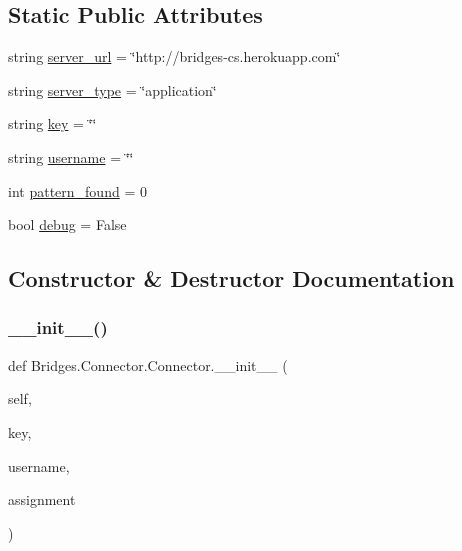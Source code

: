 \subsection*{Static Public Attributes}
\begin{DoxyCompactItemize}
\item 
string \mbox{\hyperlink{class_bridges_1_1_connector_1_1_connector_ace67271b56f8436d101e686f674acf19}{server\+\_\+url}} = \char`\"{}http\+://bridges-\/cs.\+herokuapp.\+com\char`\"{}
\item 
string \mbox{\hyperlink{class_bridges_1_1_connector_1_1_connector_ad7461a1eead38bd2ff2b6c2555f0cc61}{server\+\_\+type}} = \char`\"{}application\char`\"{}
\item 
string \mbox{\hyperlink{class_bridges_1_1_connector_1_1_connector_a3828c14583f6ba624383ead558f6a991}{key}} = \char`\"{}\char`\"{}
\item 
string \mbox{\hyperlink{class_bridges_1_1_connector_1_1_connector_acebfb8bb7592210bd98c4bb42142e35b}{username}} = \char`\"{}\char`\"{}
\item 
int \mbox{\hyperlink{class_bridges_1_1_connector_1_1_connector_ace7620706cfa2b5ca62026f10f243041}{pattern\+\_\+found}} = 0
\item 
bool \mbox{\hyperlink{class_bridges_1_1_connector_1_1_connector_a64d51697f1f2864b5dfddd08546da8f6}{debug}} = False
\end{DoxyCompactItemize}


\subsection{Constructor \& Destructor Documentation}
\mbox{\label{class_bridges_1_1_connector_1_1_connector_a805cd728024ded37faace7e858418cb0}} 
\subsubsection{\texorpdfstring{\+\_\+\+\_\+init\+\_\+\+\_\+()}{\_\_init\_\_()}}
{\footnotesize\ttfamily def Bridges.\+Connector.\+Connector.\+\_\+\+\_\+init\+\_\+\+\_\+ (\begin{DoxyParamCaption}\item[{}]{self,  }\item[{}]{key,  }\item[{}]{username,  }\item[{}]{assignment }\end{DoxyParamCaption})}



